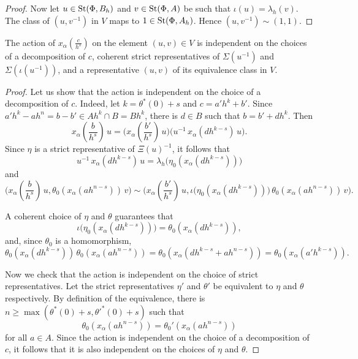 \documentclass[oneside, 11pt]{amsart} \pdfoutput=1
\begin{document}
\begin{proof}
Now let \(u \in \mathop{\mathrm{St}}\nolimits(\Phi, B_h)\) and \(v \in \mathop{\mathrm{St}}\nolimits(\Phi, A)\) be such that \(\iota(u) = \lambda_h(v)\). The class of \((u, v^{-1})\) in \(V\) maps to \(1 \in \mathop{\mathrm{St}}\nolimits(\Phi, A_h)\). Hence \((u, v^{-1}) \sim (1, 1)\).
\end{proof}

\begin{lemma}\label{well-def}
The action of \(x_\alpha(\frac c{h^s})\) on the element \((u, v) \in V\) is independent on the choices of a decomposition of \(c\), coherent strict representatives of \(\Sigma(u^{-1})\) and \(\Sigma(\iota(u^{-1}))\), and a representative \((u, v)\) of its equivalence class in \(V\).
\end{lemma}
\begin{proof}
Let us show that the action is independent on the choice of a decomposition of $c$. Indeed, let $k = \theta^*(0) + s$ and $c = a' h^k + b'$. Since $a' h^k - a h^n = b - b' \in Ah^k \cap B = Bh^k$, there is $d \in B$ such that $b = b' + dh^k$. Then
$$\textstyle
x_\alpha(\frac b {h^s})\, u = \bigl(x_\alpha(\frac{b'}{h^s})\, u\bigr) \bigl(u^{-1}\, x_\alpha(dh^{k - s})\, u\bigr).
$$
Since $\eta$ is a strict representative of $\Xi(u)^{-1}$, it follows that $$u^{-1}\, x_\alpha(dh^{k-s})\, u = \lambda_h \bigl(\eta_0(x_\alpha(dh^{k - s}))\bigr)$$
and
$$\textstyle
\bigl(x_\alpha(\frac b {h^s})\, u, \theta_0(x_\alpha(ah^{n - s}))\, v\bigr) \sim \bigl(x_\alpha(\frac{b'}{h^s})\, u, \iota\bigl(\eta_0(x_\alpha(dh^{k-s}))\bigr)\, \theta_0(x_\alpha(ah^{n - s}))\, v\bigr).
$$

A coherent choice of $\eta$ and $\theta$ guarantees that
$$
\iota\bigl(\eta_0(x_\alpha(dh^{k-s}))\bigr) = \theta_0(x_\alpha(dh^{k - s})),
$$
and, since $\theta_0$ is a homomorphism,
$$
\theta_0(x_\alpha(dh^{k - s}))\, \theta_0(x_\alpha(ah^{n - s})) = \theta_0(x_\alpha(dh^{k-s} + ah^{n - s})) = \theta_0(x_\alpha(a'h^{k - s})).
$$

Now we check that the action is independent on the choice of strict representatives. Let the strict representatives $\eta'$ and $\theta'$ be equivalent to $\eta$ and $\theta$ respectively. By definition of the equivalence, there is $n \geq \max(\theta^*(0) + s, {\theta'}^*(0) + s)$ such that 
$$
\theta_0(x_\alpha(ah^{n - s})) = \theta_0'(x_\alpha(ah^{n - s}))
$$
for all $a \in A$. Since the action is independent on the choice of a decomposition of $c$, it follows that it is also independent on the choices of $\eta$ and $\theta$.


\end{proof}
\end{document}
